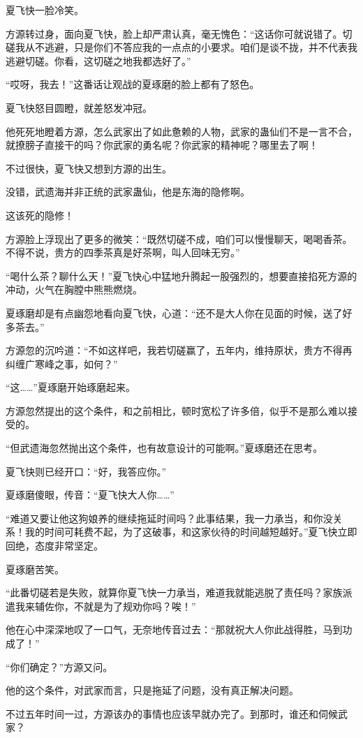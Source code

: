 \begin{this_body}
夏飞快一脸冷笑。

方源转过身，面向夏飞快，脸上却严肃认真，毫无愧色：“这话你可就说错了。切磋我从不逃避，只是你们不答应我的一点点的小要求。咱们是谈不拢，并不代表我逃避切磋。你看，这切磋之地我都选好了。”

“哎呀，我去！”这番话让观战的夏琢磨的脸上都有了怒色。

夏飞快怒目圆瞪，就差怒发冲冠。

他死死地瞪着方源，怎么武家出了如此惫赖的人物，武家的蛊仙们不是一言不合，就撩膀子直接干的吗？你武家的勇名呢？你武家的精神呢？哪里去了啊！

不过很快，夏飞快又想到方源的出生。

没错，武遗海并非正统的武家蛊仙，他是东海的隐修啊。

这该死的隐修！

方源脸上浮现出了更多的微笑：“既然切磋不成，咱们可以慢慢聊天，喝喝香茶。不得不说，贵方的四季茶真是好茶啊，叫人回味无穷。”

“喝什么茶？聊什么天！”夏飞快心中猛地升腾起一股强烈的，想要直接掐死方源的冲动，火气在胸膛中熊熊燃烧。

夏琢磨却是有点幽怨地看向夏飞快，心道：“还不是大人你在见面的时候，送了好多茶去。”

方源忽的沉吟道：“不如这样吧，我若切磋赢了，五年内，维持原状，贵方不得再纠缠广寒峰之事，如何？”

“这……”夏琢磨开始琢磨起来。

方源忽然提出的这个条件，和之前相比，顿时宽松了许多倍，似乎不是那么难以接受的。

“但武遗海忽然抛出这个条件，也有故意设计的可能啊。”夏琢磨还在思考。

夏飞快则已经开口：“好，我答应你。”

夏琢磨傻眼，传音：“夏飞快大人你……”

“难道又要让他这狗娘养的继续拖延时间吗？此事结果，我一力承当，和你没关系！我的时间可耗费不起，为了这破事，和这家伙待的时间越短越好。”夏飞快立即回绝，态度非常坚定。

夏琢磨苦笑。

“此番切磋若是失败，就算你夏飞快一力承当，难道我就能逃脱了责任吗？家族派遣我来辅佐你，不就是为了规劝你吗？唉！”

他在心中深深地叹了一口气，无奈地传音过去：“那就祝大人你此战得胜，马到功成了！”

“你们确定？”方源又问。

他的这个条件，对武家而言，只是拖延了问题，没有真正解决问题。

不过五年时间一过，方源该办的事情也应该早就办完了。到那时，谁还和伺候武家？


\end{this_body}
